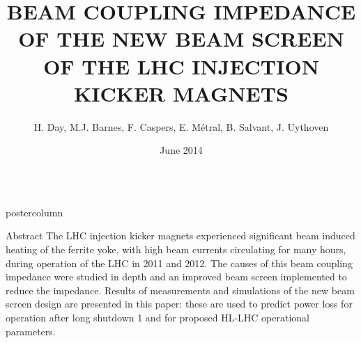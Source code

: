 \documentclass[final,hyperref={pdfpagelabels=false}]{beamer}
\title{BEAM COUPLING IMPEDANCE OF THE NEW BEAM SCREEN OF THE LHC INJECTION KICKER MAGNETS}
\author{H. Day, M.J. Barnes, F. Caspers, E. Métral, B. Salvant, J. Uythoven}
\institute[CERN]{CERN, Geneva, Switzerland}
\date[June 2014]{June 2014}
\newlength{\columnheight}
\begin{document}
\begin{frame}
  \begin{columns}
    \begin{column}{.49\textwidth}
      \begin{beamercolorbox}[center,wd=\textwidth]{postercolumn}
        \begin{minipage}[T]{.95\textwidth}  %
          \parbox[t][\columnheight]{\textwidth}{ %
            \begin{block}{Abstract}
\small{
The LHC injection kicker magnets experienced significant beam induced heating of the ferrite yoke, with high beam currents circulating for many hours, during operation of the LHC in 2011 and 2012. The causes of this beam coupling impedance were studied in depth and an improved beam screen implemented to reduce the impedance. Results of measurements and simulations of the new beam screen design are presented in this paper: these are used to predict power loss for operation after long shutdown 1 and for proposed HL-LHC operational parameters.
}
\end{block}
            \vfill

}
\end{minipage}
\end{beamercolorbox}
\end{column}
\end{columns}
\end{frame}
\end{document}
